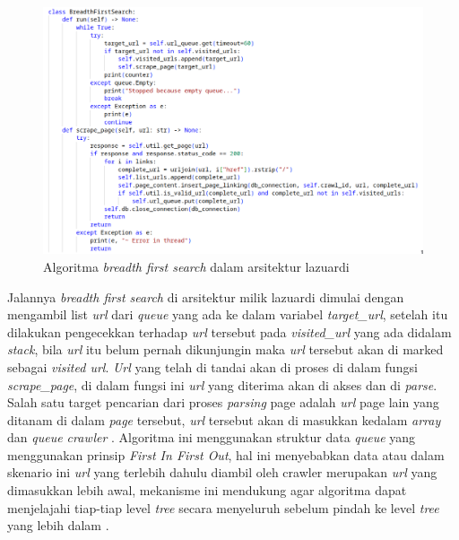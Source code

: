 \begin{figure}[H]
	\centering
	\includegraphics[keepaspectratio, width=15cm]{gambar/bfs-python.png}
  \caption{Algoritma \emph{breadth first search} dalam arsitektur lazuardi \citep{lazuardithesis}}
	\label{gambar:bfs_python} 
\end{figure}

Jalannya \emph{breadth first search} di arsitektur milik lazuardi dimulai dengan mengambil list \emph{url} dari \emph{queue} yang ada ke dalam variabel \emph{target\_url}, setelah itu dilakukan pengecekkan terhadap \emph{url} tersebut pada \emph{visited\_url} yang ada didalam \emph{stack}, bila \emph{url} itu belum pernah dikunjungin maka \emph{url} tersebut akan di marked sebagai \emph{visited url}. \emph{Url} yang telah di tandai akan di proses di dalam fungsi \emph{scrape\_page}, di dalam fungsi ini \emph{url} yang diterima akan di akses dan di \emph{parse}. Salah satu target pencarian dari proses \emph{parsing} page adalah \emph{url} page lain yang ditanam di dalam \emph{page} tersebut, \emph{url} tersebut akan di masukkan kedalam \emph{array} dan \emph{queue crawler} \citep{lazuardithesis}. Algoritma ini menggunakan struktur data \emph{queue} yang menggunakan prinsip \emph{First In First Out}, hal ini menyebabkan data atau dalam skenario ini \emph{url} yang terlebih dahulu diambil oleh crawler merupakan \emph{url} yang dimasukkan lebih awal, mekanisme ini mendukung agar algoritma dapat menjelajahi tiap-tiap level \emph{tree} secara menyeluruh sebelum pindah ke level \emph{tree} yang lebih dalam \citep{cormen2009introduction}. 

